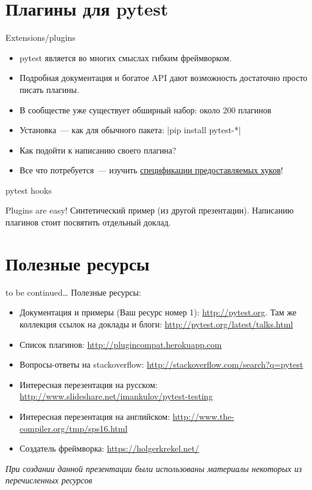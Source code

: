 \documentclass{beamer}
\begin{document}
\section{Плагины для pytest}
\begin{frame}[fragile]{Extensions/plugins}
    \begin{itemize}
    \item pytest является во многих смыслах гибким фреймворком.
    \pause \item Подробная документация и богатое API дают возможность достаточно просто писать плагины.
    \pause \item В сообществе уже существует обширный набор: около 200 плагинов
    \pause \item Установка~--- как для обычного пакета: |pip install pytest-*|
    \pause \item Как подойти к написанию своего плагина?
    \pause \item Все что потребуется~--- изучить \href{http://pytest.org/latest/writing_plugins.html\#pytest-hook-reference}{спецификации предоставляемых хуков}!
    \end{itemize}
\end{frame}

\begin{frame}[fragile]{pytest hooks}
\end{frame}

\begin{frame}[fragile]{Plugins are easy!}
    Синтетический пример (из другой презентации).
    Написанию плагинов стоит посвятить отдельный доклад.
\end{frame}

\section{Полезные ресурсы}
\begin{frame}[fragile]{to be continued\ldots}
    Полезные ресурсы:
    \begin{itemize}
    \item Документация и примеры (Ваш ресурс номер 1): \url{http://pytest.org}.
    Там же коллекция ссылок на доклады и блоги: \url{http://pytest.org/latest/talks.html}
    \item Список плагинов: \url{http://plugincompat.herokuapp.com}
    \item Вопросы-ответы на stackoverflow: \url{http://stackoverflow.com/search?q=pytest}
    \item Интересная перезентация на русском: \url{http://www.slideshare.net/imankulov/pytest-testing}
    \item Интересная перезентация на английском: \url{http://www.the-compiler.org/tmp/sps16.html}
    \item Создатель фреймворка: \url{https://holgerkrekel.net/}
    \end{itemize}
    \footnotesize\emph{При создании данной презентации были использованы материалы некоторых из перечисленных ресурсов}
\end{frame}
\end{document}
